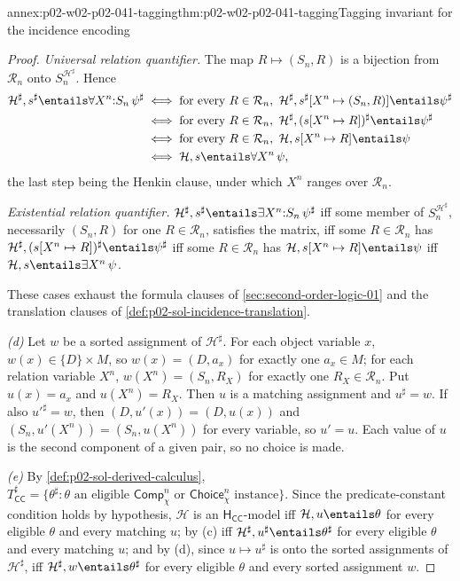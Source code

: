 \begin{annexitem}{annex:p02-w02-p02-041-tagging}{thm:p02-w02-p02-041-tagging}{Tagging invariant for the incidence encoding}
\begin{proof}
\emph{Universal relation quantifier.}  The map \(R\mapsto(S_n,R)\) is a
bijection from \(\mathcal R_n\) onto \(S_n^{\mathcal H^\sharp}\).  Hence
\[
\begin{aligned}
 \mathcal H^\sharp,s^\sharp\entails\forall X^n{:}S_n\,\psi^\sharp
 &\iff\text{for every }R\in\mathcal R_n,\
   \mathcal H^\sharp,s^\sharp[X^n\mapsto(S_n,R)]\entails\psi^\sharp\\
 &\iff\text{for every }R\in\mathcal R_n,\
   \mathcal H^\sharp,(s[X^n\mapsto R])^\sharp\entails\psi^\sharp\\
 &\iff\text{for every }R\in\mathcal R_n,\
   \mathcal H,s[X^n\mapsto R]\entails\psi\\
 &\iff\mathcal H,s\entails\forall X^n\,\psi,
\end{aligned}
\]
the last step being the Henkin clause, under which \(X^n\) ranges over
\(\mathcal R_n\).

\emph{Existential relation quantifier.}
\(\mathcal H^\sharp,s^\sharp\entails\exists X^n{:}S_n\,\psi^\sharp\) iff some
member of \(S_n^{\mathcal H^\sharp}\), necessarily \((S_n,R)\) for one
\(R\in\mathcal R_n\), satisfies the matrix, iff some \(R\in\mathcal R_n\) has
\(\mathcal H^\sharp,(s[X^n\mapsto R])^\sharp\entails\psi^\sharp\) iff some
\(R\in\mathcal R_n\) has \(\mathcal H,s[X^n\mapsto R]\entails\psi\) iff
\(\mathcal H,s\entails\exists X^n\,\psi\).

These cases exhaust the formula clauses of
\cref{sec:second-order-logic-01} and the translation clauses of
\cref{def:p02-sol-incidence-translation}.

\emph{(d)}  Let \(w\) be a sorted assignment of \(\mathcal H^\sharp\).  For
each object variable \(x\), \(w(x)\in\{D\}\times M\), so \(w(x)=(D,a_x)\) for
exactly one \(a_x\in M\); for each relation variable \(X^n\),
\(w(X^n)=(S_n,R_X)\) for exactly one \(R_X\in\mathcal R_n\).  Put
\(u(x)=a_x\) and \(u(X^n)=R_X\).  Then \(u\) is a matching assignment and
\(u^\sharp=w\).  If also \(u'^\sharp=w\), then \((D,u'(x))=(D,u(x))\) and
\((S_n,u'(X^n))=(S_n,u(X^n))\) for every variable, so \(u'=u\).  Each value
of \(u\) is the second component of a given pair, so no choice is made.

\emph{(e)}  By \cref{def:p02-sol-derived-calculus},
\(T_{\mathsf{CC}}^\sharp=\{\theta^\sharp:\theta\text{ an eligible }
\mathsf{Comp}^n_\chi\text{ or }\mathsf{Choice}^n_\chi\text{ instance}\}\).
Since the predicate-constant condition holds by hypothesis, \(\mathcal H\) is
an \(\mathsf H_{\mathsf{CC}}\)-model iff \(\mathcal H,u\entails\theta\) for
every eligible \(\theta\) and every matching \(u\); by (c) iff
\(\mathcal H^\sharp,u^\sharp\entails\theta^\sharp\) for every eligible
\(\theta\) and every matching \(u\); and by (d), since \(u\mapsto u^\sharp\)
is onto the sorted assignments of \(\mathcal H^\sharp\), iff
\(\mathcal H^\sharp,w\entails\theta^\sharp\) for every eligible \(\theta\) and
every sorted assignment \(w\).
\end{proof}
\end{annexitem}

